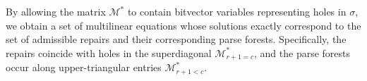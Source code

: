 \documentclass[sigplan,review,anonymous,acmsmall]{acmart}\settopmatter{printfolios=false,printccs=false,printacmref=false}
\begin{document}
\noindent By allowing the matrix $\mathcal{M}^*$ to contain bitvector variables representing holes in $\sigma$, we obtain a set of multilinear equations whose solutions exactly correspond to the set of admissible repairs and their corresponding parse forests. Specifically, the repairs coincide with holes in the superdiagonal $\mathcal{M}^*_{r+1 = c}$, and the parse forests occur along upper-triangular entries $\mathcal{M}^*_{r + 1 < c}$.
%
%
%

\end{document}
